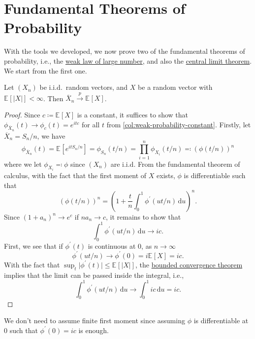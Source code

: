 \section{Fundamental Theorems of Probability}
With the tools we developed, we now prove two of the fundamental theorems of probability, i.e., the \hyperref[thm:WLLN]{weak law of large number}, and also the \hyperref[thm:CLT]{central limit theorem}. We start from the first one.

\begin{theorem}\label{thm:WLLN}
	Let \((X_n)\) be i.i.d.\ random vectors, and \(X\) be a random vector with \(\mathbb{E}_{}[\vert X \vert ] < \infty \). Then \(\overline{X} _n \overset{p}{\to } \mathbb{E}_{}[X] \).
\end{theorem}
\begin{proof}
	Since \(c \coloneqq \mathbb{E}_{}[X] \) is a constant, it suffices to show that \(\phi _{\overline{X} _n}(t) \to \phi _{c} (t) = e^{itc}\) for all \(t\) from \autoref{col:weak-probability-constant}. Firstly, let \(\overline{X} _n = S_n / n\), we have
	\[
		\phi _{\overline{X} _n}(t)
		= \mathbb{E}_{}[e^{it S_n / n}]
		= \phi _{S_n}(t / n)
		= \prod_{i=1}^{n} \phi _{X_i}(t / n)
		\eqqcolon \left( \phi (t / n) \right) ^n
	\]
	where we let \(\phi _{X_i} \eqqcolon \phi \) since \((X_n)\) are i.i.d. From the fundamental theorem of calculus, with the fact that the first moment of \(X\) exists, \(\phi \) is differentiable such that
	\[
		\left( \phi (t / n) \right) ^n
		= \left( 1 + \frac{t}{n} \int_{0}^{1} \phi ^{\prime} (u t / n) \,\mathrm{d}u  \right) ^n .
	\]
	Since \((1 + a_n)^n \to e^c\) if \(n a_n \to c\), it remains to show that
	\[
		\int_{0}^{1} \phi ^{\prime} (u t / n) \,\mathrm{d}u
		\to ic.
	\]
	First, we see that if \(\phi ^{\prime} (t)\) is continuous at \(0\), as \(n \to \infty \)
	\[
		\phi ^{\prime} (u t / n) \to \phi ^{\prime} (0) = i \mathbb{E}_{}[X] = ic.
	\]
	With the fact that \(\sup _t \vert \phi ^{\prime} (t) \vert \leq \mathbb{E}_{}[\vert X \vert ] \), the \href{https://en.wikipedia.org/wiki/Dominated_convergence_theorem}{bounded convergence theorem} implies that the limit can be passed inside the integral, i.e.,
	\[
		\int_{0}^{1} \phi ^{\prime} (ut / n) \,\mathrm{d}u
		\to \int_{0}^{1} ic \,\mathrm{d}u
		= ic.
	\]
\end{proof}

\begin{remark}
	We don't need to assume finite first moment since assuming \(\phi \) is differentiable at \(0\) such that \(\phi ^{\prime} (0) = ic\) is enough.
\end{remark}

